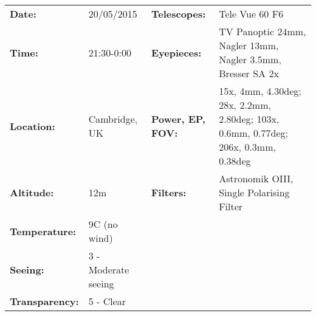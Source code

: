 \begin{tabular}{ p{0.9in} p{1.3in} p{1.2in} p{5.2in}}
{\bf Date:} & 20/05/2015 & {\bf Telescopes:} & Tele Vue 60 F6 \\ 
{\bf Time:} & 21:30-0:00 & {\bf Eyepieces:} & TV Panoptic 24mm, Nagler 13mm, Nagler 3.5mm, Bresser SA 2x \\ 
{\bf Location:} & Cambridge, UK & {\bf Power, EP, FOV:} & 15x, 4mm, 4.30deg; 28x, 2.2mm, 2.80deg; 103x, 0.6mm, 0.77deg; 206x, 0.3mm, 0.38deg \\ 
{\bf Altitude:} & 12m & {\bf Filters:} & Astronomik OIII, Single Polarising Filter \\ 
{\bf Temperature:} & 9C (no wind) & & \\ 
{\bf Seeing:} & 3 - Moderate seeing & & \\ 
{\bf Transparency:} & 5 - Clear & & \\ 
\end{tabular}
\centering 
